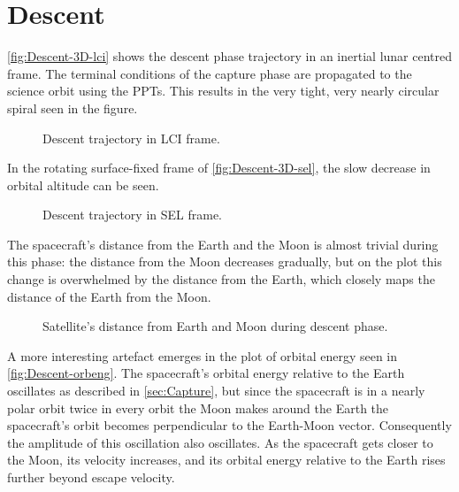 
\clearpage

\section{Descent} \label{sec:Descent}

\autoref{fig:Descent-3D-lci} shows the descent phase trajectory in an inertial lunar centred frame. The terminal conditions of the capture phase are propagated to the science orbit using the PPTs. This results in the very tight, very nearly circular spiral seen in the figure.

\begin{figure}
\centering
\def\svgwidth{\figurewidth}

\caption{Descent trajectory in LCI frame.}
\label{fig:Descent-3D-lci}
\end{figure}

In the rotating surface-fixed frame of \autoref{fig:Descent-3D-sel}, the slow decrease in orbital altitude can be seen.

\begin{figure}
\centering
\def\svgwidth{\figurewidth}

\caption{Descent trajectory in SEL frame.}
\label{fig:Descent-3D-sel}
\end{figure}

The spacecraft's distance from the Earth and the Moon is almost trivial during this phase: the distance from the Moon decreases gradually, but on the plot this change is overwhelmed by the distance from the Earth, which closely maps the distance of the Earth from the Moon.

\begin{figure}
\centering
\def\svgwidth{\figurewidth}

\caption{Satellite's distance from Earth and Moon during descent phase.}
\label{fig:Descent-dist}
\end{figure}

A more interesting artefact emerges in the plot of orbital energy seen in \autoref{fig:Descent-orbeng}. The spacecraft's orbital energy relative to the Earth oscillates as described in \autoref{sec:Capture}, but since the spacecraft is in a nearly polar orbit twice in every orbit the Moon makes around the Earth the spacecraft's orbit becomes perpendicular to the Earth-Moon vector. Consequently the amplitude of this oscillation also oscillates. As the spacecraft gets closer to the Moon, its velocity increases, and its orbital energy relative to the Earth rises further beyond escape velocity.


